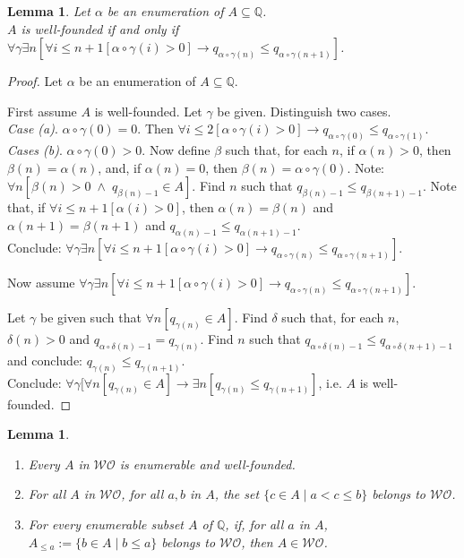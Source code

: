 \documentclass[a4paper]{amsart}
\theoremstyle{plain}
\newtheorem{lemma}[theorem]{Lemma}
\begin{document}
 \begin{lemma}\label{L:decidablewf}  Let $\alpha$ be an enumeration of $A\subseteq \mathbb{Q}$. \\$A$ is well-founded if and only if $\forall \gamma\exists n[ \forall i\le n+1[\alpha\circ\gamma(i)>0]\rightarrow q_{\alpha\circ\gamma(n)}\le q_{\alpha\circ\gamma(n+1)}]$. \end{lemma} 
 \begin{proof} Let $\alpha$ be an enumeration of $A\subseteq \mathbb{Q}$. 
 
 \smallskip First assume $A$ is well-founded. Let $\gamma$ be given. Distinguish two cases. \\ \textit{Case (a)}. $\alpha\circ\gamma(0)=0$. Then $\forall i\le 2[\alpha\circ\gamma(i)>0]\rightarrow q_{\alpha\circ \gamma(0)}\le q_{\alpha\circ\gamma(1)}$.
 \\ \textit{Cases (b)}. $\alpha\circ\gamma(0)>0$. Now define $\beta$ such that, for each $n$, if $\alpha(n)>0$, then $\beta(n) =\alpha(n)$, and, if $\alpha(n)=0$, then $\beta(n)=\alpha\circ\gamma(0)$. Note: $\forall n[\beta(n)>0 \;\wedge\; q_{\beta(n)-1} \in A]$. Find $n$ such that $q_{\beta(n)-1} \le q_{\beta(n+1)-1}$. Note that, if $\forall i\le n+1[\alpha(i)>0]$, then $\alpha(n)=\beta(n)$ and $\alpha(n+1)=\beta(n+1)$ and   $q_{\alpha(n)-1} \le q_{\alpha(n+1)-1}$.  \\Conclude: $\forall \gamma\exists n[ \forall i\le n+1[\alpha\circ\gamma(i)>0]\rightarrow q_{\alpha\circ\gamma(n)}\le q_{\alpha\circ\gamma(n+1)}]$.
 
 
 \smallskip  Now assume $\forall \gamma\exists n[ \forall i\le n+1[\alpha\circ\gamma(i)>0]\rightarrow q_{\alpha\circ\gamma(n)}\le q_{\alpha\circ\gamma(n+1)}]$.  
 
 Let $\gamma$ be given such that $\forall n[q_{\gamma(n)}\in A]$. Find $\delta$ such that, for each $n$, $\delta(n) >0$ and $q_{\alpha\circ\delta(n)-1}=q_{\gamma(n)}$. Find $n$ such that $q_{\alpha\circ\delta(n)-1}\le q_{\alpha\circ\delta(n+1)-1}$ and conclude: $q_{\gamma(n)}\le q_{\gamma(n+1)}$.
 \\ Conclude: $\forall \gamma [\forall n [q_{\gamma(n)}\in A]\rightarrow \exists n[q_{\gamma(n)}\le q_{\gamma(n+1)}]$, i.e. $A$ is well-founded. \end{proof}
 \begin{lemma}\label{L:wo}$\;$\begin{enumerate}[\upshape(i)]\item Every $A$ in $\mathcal{WO}$ is enumerable and well-founded.\item For all $A$ in $\mathcal{WO}$,  for all $a,b$ in $ A$, the set $\{c\in A\mid a< c \le b\}$ belongs to $\mathcal{WO}$. \item For every enumerable subset $A$ of $\mathbb{Q}$, if, for all $a$ in $A$, $A_{\le a}:=\{b\in A\mid b\le a\}$ belongs to $\mathcal{WO}$, then $A \in \mathcal{WO}$. \end{enumerate} \end{lemma}
 
\end{document}
